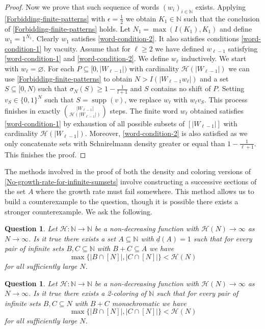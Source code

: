 \documentclass[letter, 11pt]{article}
\theoremstyle{plain} %
\newtheorem{question}[theorem]{Question}
\theoremstyle{definition} %
\theoremstyle{plain}
\theoremstyle{plain}
\newcommand{\N}{\mathbb{N}}
\DeclareMathOperator\supp{supp}
\newcommand{\1}{\mathbbm{1}}
\begin{document}
\begin{proof}
    Now we prove that such sequence of words $(w_i)_{i\in \N}$ exists. Applying \cref{Forbidding-finite-patterns} with $\epsilon=\frac{1}{2} $ we obtain $K_1\in \N$ such that the conclusion of \cref{Forbidding-finite-patterns} holds. Let $N_1=\max(I(K_1),K_1)$ and define $w_1=1^{N_1}$. Clearly $w_1$ satisfies \cref{word-condition-2}. It also satisfies conditions \cref{word-condition-1} by vacuity. Assume that for $\ell\geq 2$ we have defined $w_{\ell-1}$ satisfying \cref{word-condition-1} and \cref{word-condition-2}. We define $w_{\ell}$ inductively. We start with $w_{\ell}=\varnothing$. For each $P\subseteq [0,|W_{\ell-1}|)$ with cardinality $\mathcal{H}(|W_{\ell-1}|)$ we can use \cref{Forbidding-finite-patterns} to obtain $N>I(|W_{\ell-1}w_{\ell}|)$ and a set $S\subseteq [0,N)$ such that $\sigma_{N}(S)\geq 1- \frac{1}{l+1}$ and $S$ contains no shift of $P$. Setting $v_S\in \{0,1\}^{N}$ such that $S=\supp(v)$, we replace $w_{\ell}$ with $w_{\ell}v_S$. This process finishes in exactly $\binom{|W_{\ell-1}|}{\mathcal{H}(|W_{\ell-1}|)}$ steps. The finite word $w_{\ell}$ obtained satisfies \cref{word-condition-1} by exhaustion of all possible subsets of $[|W_{\ell-1}|]$ with cardinality $\mathcal{H}(|W_{\ell-1}|)$. Moreover, \cref{word-condition-2} is also satisfied as we only concatenate sets with Schnirelmann density greater or equal than $1 - \frac{1}{\ell+1}$. This finishes the proof. 
 \end{proof}


The methods involved in the proof of both the density and coloring versions of \cref{No-growth-rate-for-infinite-sumsets} involve constructing a successive sections of the set $A$ where the growth rate must fail somewhere. This method allows us to build a counterexample to the question, though it is possible there exists a stronger counterexample. We ask the following.

\begin{question}\label{q-1}
    Let $\mathcal{H}:\N \to \N$ be a non-decreasing function with $\mathcal{H}(N) \to \infty$ as $N \to \infty$. Is it true there exists a set $A \subseteq \N$ with $\underline{d}(A) = 1$ such that for every pair of infinite sets $B,C \subseteq \N$ with $B+C \subseteq A$ we have
        \[
        \max \{ |B \cap [N]|, |C \cap [N]| \} < \mathcal{H}(N)
        \]
    for all sufficiently large $N$.
\end{question}
\begin{question}\label{q-2}
    Let $\mathcal{H}:\N \to \N$ be a non-decreasing function with $\mathcal{H}(N) \to \infty$ as $N \to \infty$. Is it true there exists a 2-coloring of $\N$ such that for every pair of infinite sets $B,C \subseteq N$ with $B+C$ monochromatic we have
        \[
        \max \{ |B \cap [N]|, |C \cap [N]| \} < \mathcal{H}(N)
        \]
    for all sufficiently large $N$.
\end{question}
\end{document}
